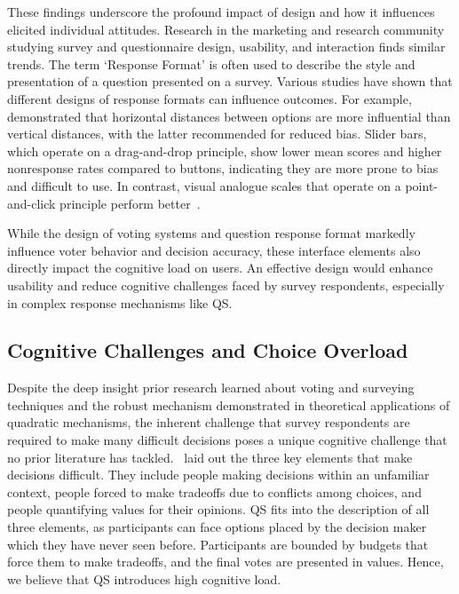 These findings underscore the profound impact of design and how it influences elicited individual attitudes. Research in the marketing and research community studying survey and questionnaire design, usability, and interaction finds similar trends. The term `Response Format' is often used to describe the style and presentation of a question presented on a survey. Various studies have shown that different designs of response formats can influence outcomes. For example, \textcite{weijtersExtremityHorizontalVertical2021} demonstrated that horizontal distances between options are more influential than vertical distances, with the latter recommended for reduced bias. Slider bars, which operate on a drag-and-drop principle, show lower mean scores and higher nonresponse rates compared to buttons, indicating they are more prone to bias and difficult to use. In contrast, visual analogue scales that operate on a point-and-click principle perform better~\cite{toepoelSlidersVisualAnalogue2018}. 

While the design of voting systems and question response format markedly influence voter behavior and decision accuracy, these interface elements also directly impact the cognitive load on users. An effective design would enhance usability and reduce cognitive challenges faced by survey respondents, especially in complex response mechanisms like QS.

\subsection{Cognitive Challenges and Choice Overload}
Despite the deep insight prior research learned about voting and surveying techniques and the robust mechanism demonstrated in theoretical applications of quadratic mechanisms, the inherent challenge that survey respondents are required to make many difficult decisions poses a unique cognitive challenge that no prior literature has tackled.~\textcite{lichtensteinConstructionPreference2006} laid out the three key elements that make decisions difficult. They include people making decisions within an unfamiliar context, people forced to make tradeoffs due to conflicts among choices, and people quantifying values for their opinions. QS fits into the description of all three elements, as participants can face options placed by the decision maker which they have never seen before. Participants are bounded by budgets that force them to make tradeoffs, and the final votes are presented in values. Hence, we believe that QS introduces high cognitive load.

